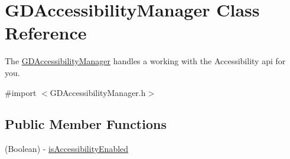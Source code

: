 \hypertarget{interface_g_d_accessibility_manager}{
\section{GDAccessibilityManager Class Reference}
\label{interface_g_d_accessibility_manager}
}


The \hyperlink{interface_g_d_accessibility_manager}{GDAccessibilityManager} handles a working with the Accessibility api for you.  


{\ttfamily \#import $<$GDAccessibilityManager.h$>$}\subsection*{Public Member Functions}
\begin{DoxyCompactItemize}
\item 
\hypertarget{interface_g_d_accessibility_manager_aa1c15fda19a039bbcc89620f3291ae3e}{
(Boolean) -\/ \hyperlink{interface_g_d_accessibility_manager_aa1c15fda19a039bbcc89620f3291ae3e}{isAccessibilityEnabled}}
\label{interface_g_d_accessibility_manager_aa1c15fda19a039bbcc89620f3291ae3e}


\end{DoxyCompactItemize}
